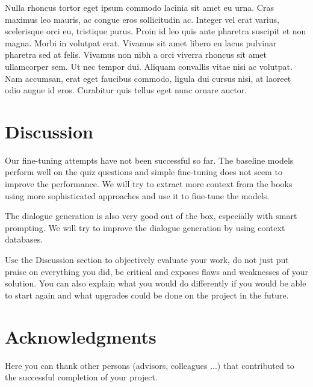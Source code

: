 \documentclass[fleqn,moreauthors,10pt]{ds_report}
\begin{document}
Nulla rhoncus tortor eget ipsum commodo lacinia sit amet eu urna. Cras maximus leo mauris, ac congue eros sollicitudin ac. Integer vel erat varius, scelerisque orci eu, tristique purus. Proin id leo quis ante pharetra suscipit et non magna. Morbi in volutpat erat. Vivamus sit amet libero eu lacus pulvinar pharetra sed at felis. Vivamus non nibh a orci viverra rhoncus sit amet ullamcorper sem. Ut nec tempor dui. Aliquam convallis vitae nisi ac volutpat. Nam accumsan, erat eget faucibus commodo, ligula dui cursus nisi, at laoreet odio augue id eros. Curabitur quis tellus eget nunc ornare auctor.



\section*{Discussion}

Our fine-tuning attempts have not been successful so far.
The baseline models perform well on the quiz questions and simple fine-tuning does not seem to improve the performance.
We will try to extract more context from the books using more sophisticated approaches and use it to fine-tune the models.

The dialogue generation is also very good out of the box, especially with smart prompting.
We will try to improve the dialogue generation by using context databases.



Use the Discussion section to objectively evaluate your work, do not just put praise on everything you did, be critical and exposes flaws and weaknesses of your solution. You can also explain what you would do differently if you would be able to start again and what upgrades could be done on the project in the future.



\section*{Acknowledgments}


Here you can thank other persons (advisors, colleagues ...) that contributed to the successful completion of your project.




\end{document}
